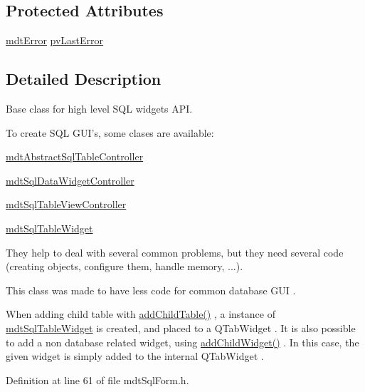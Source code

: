 \subsection*{Protected Attributes}
\begin{DoxyCompactItemize}
\item 
\hyperlink{classmdt_error}{mdt\-Error} \hyperlink{classmdt_sql_form_afc24e8dedd1249a29708347fdff560fd}{pv\-Last\-Error}
\end{DoxyCompactItemize}


\subsection{Detailed Description}
Base class for high level S\-Q\-L widgets A\-P\-I. 

To create S\-Q\-L G\-U\-I's, some clases are available\-:
\begin{DoxyItemize}
\item \hyperlink{classmdt_abstract_sql_table_controller}{mdt\-Abstract\-Sql\-Table\-Controller}
\item \hyperlink{classmdt_sql_data_widget_controller}{mdt\-Sql\-Data\-Widget\-Controller}
\item \hyperlink{classmdt_sql_table_view_controller}{mdt\-Sql\-Table\-View\-Controller}
\item \hyperlink{classmdt_sql_table_widget}{mdt\-Sql\-Table\-Widget}
\end{DoxyItemize}

They help to deal with several common problems, but they need several code (creating objects, configure them, handle memory, ...).

This class was made to have less code for common database G\-U\-I .

When adding child table with \hyperlink{classmdt_sql_form_a9c48a7af83effbc50e9171a8d7ff3889}{add\-Child\-Table()} , a instance of \hyperlink{classmdt_sql_table_widget}{mdt\-Sql\-Table\-Widget} is created, and placed to a Q\-Tab\-Widget . It is also possible to add a non database related widget, using \hyperlink{classmdt_sql_form_a86174e002c2dd5496ab74a7eb67c614c}{add\-Child\-Widget()} . In this case, the given widget is simply added to the internal Q\-Tab\-Widget . 

Definition at line 61 of file mdt\-Sql\-Form.\-h.



